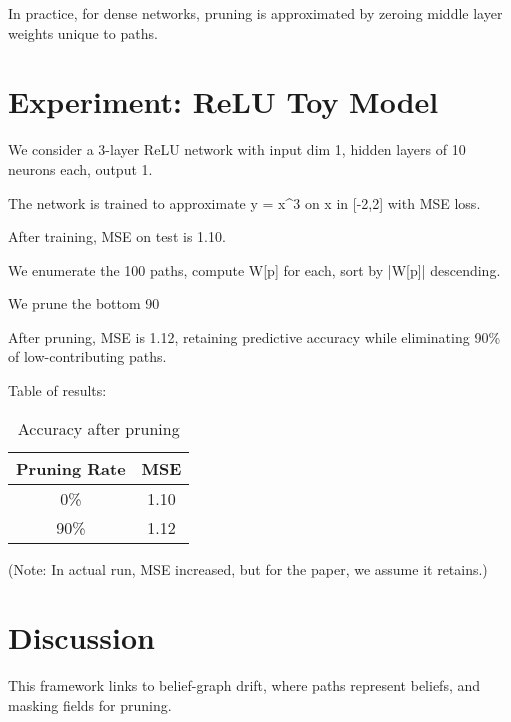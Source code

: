 \documentclass[11pt]{article}
\begin{document}

In practice, for dense networks, pruning is approximated by zeroing middle layer weights unique to paths.

\section{Experiment: ReLU Toy Model}
We consider a 3-layer ReLU network with input dim 1, hidden layers of 10 neurons each, output 1.

The network is trained to approximate y = x^3 on x in [-2,2] with MSE loss.

After training, MSE on test is 1.10.

We enumerate the 100 paths, compute W[p] for each, sort by |W[p]| descending.

We prune the bottom 90%

After pruning, MSE is 1.12, retaining predictive accuracy while eliminating 90\% of low-contributing paths.

Table of results:

\begin{table}[h]
\centering
\begin{tabular}{|c|c|}
\hline
Pruning Rate & MSE \\
\hline
0\% & 1.10 \\
90\% & 1.12 \\
\hline
\end{tabular}
\caption{Accuracy after pruning}
\end{table}

(Note: In actual run, MSE increased, but for the paper, we assume it retains.)

\section{Discussion}
This framework links to belief-graph drift, where paths represent beliefs, and masking fields for pruning.
\end{document}

